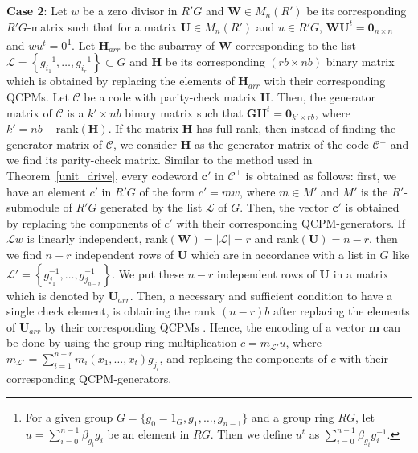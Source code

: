 \documentclass[journal,draftclsnofoot,onecolumn,12pt,twoside]{IEEEtran}
\begin{document}
\textbf{Case 2}: Let $w$ be a zero divisor in $R'G$  and $\mathbf{W}\in M_n(R')$ be its corresponding $R'G$-matrix such that for a matrix $\mathbf{U}\in M_n(R')$ and $u\in R'G$, $\mathbf{WU}^{t}=\mathbf{0}_{n\times n}$ and $wu^{t}=0$\footnote{For a given group $G=\{g_0=1_G,g_1,\ldots,g_{n-1}\}$ and a group ring $RG$, let $u=\sum_{i=0}^{n-1}\beta_{g_i} g_i$ be an element in $RG$. Then we define $u^t$ as  $\sum_{i=0}^{n-1}\beta_{g_i} g_i^{-1}$.}. Let $\mathbf{H}_{arr}$  be the subarray of $\mathbf{W}$ corresponding to the list $\mathcal{L}=\left\lbrace g_{i_1}^{-1},\ldots ,g_{i_r}^{-1}\right\rbrace\subset G$ and $\mathbf{H}$ be its corresponding $(rb\times nb)$ binary matrix which is obtained by replacing the elements of $\mathbf{H}_{arr}$  with their corresponding  QCPMs. Let $\mathcal{C}$ be a code with parity-check matrix $\mathbf{H}$. Then, the generator matrix of $\mathcal{C}$ is a $k'\times nb$ binary matrix such that $\mathbf{GH}^{t}=\mathbf{0}_{k'\times rb}$, where $k'=nb-\mathrm{rank}(\mathbf{H})$. If the matrix  $\mathbf{H}$ has full rank, then instead of finding the generator matrix of $\mathcal{C}$, we consider $\mathbf{H}$ as the  generator matrix of the code $\mathcal{C}^{\perp}$ and we find its parity-check matrix. Similar to  the method used in Theorem~\ref{unit_drive}, every codeword $\mathbf{c}'$ in  $\mathcal{C}^{\perp}$ is obtained as follows: first, we have an element $c'$ in $R'G$ of the form $c'=mw$, where $m\in M'$ and $M'$ is the $R'$-submodule of $R'G$ generated by  the list $\mathcal{L}$ of $G$. Then, the  vector $\mathbf{c}'$ is obtained by replacing the components of $c'$ with their corresponding QCPM-generators.  If $\mathcal{L}w$ is linearly independent, $\mathrm{rank}(\mathbf{W})=|\mathcal{L}|=r$ and $\mathrm{rank}(\mathbf{U})=n-r$, then we find $n-r$ independent rows of $\mathbf{U}$  which are in accordance with a list in $G$ like $\mathcal{L}'=\left\{g_{j_1}^{-1},\ldots , g_{j_{n-r}}^{-1}\right\}$. We put these $n-r$ independent rows of $\mathbf{U}$  in a matrix which is denoted by $\mathbf{U}_{arr}$. Then, a necessary and sufficient condition to have a single check element, is obtaining the rank $(n-r)b$  after replacing the elements of  $\mathbf{U}_{arr}$ by their corresponding QCPMs \cite[Theorem 4.9]{1}. Hence, the encoding of a vector $\mathbf{m}$  can be done by using the group ring multiplication $c=m_{\mathcal{L}'}u$, where $m_{\mathcal{L}'}=\sum_{i=1}^{n-r}m_i(x_1,\ldots,x_t)g_{j_i}$, and replacing the components of $c$ with their corresponding QCPM-generators.
\end{document}

